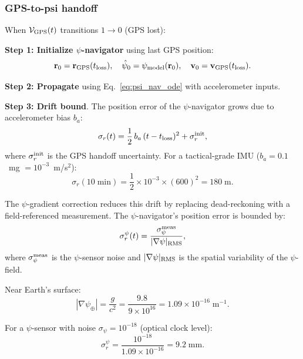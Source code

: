 \documentclass[aps,prd,twocolumn,superscriptaddress,nofootinbib]{revtex4-2}
\begin{document}
\subsubsection{GPS-to-psi handoff}

When $\mathcal{V}_{\rm GPS}(t)$ transitions $1 \to 0$ (GPS lost):

\textbf{Step 1: Initialize $\psi$-navigator} using last GPS position:
\begin{equation}
\mathbf{r}_0 = \mathbf{r}_{\rm GPS}(t_{\rm loss}),\quad
\hat{\psi}_0 = \psi_{\rm model}(\mathbf{r}_0),\quad
\mathbf{v}_0 = \mathbf{v}_{\rm GPS}(t_{\rm loss}).
\label{eq:handoff_init}
\end{equation}

\textbf{Step 2: Propagate} using Eq.~\eqref{eq:psi_nav_ode} with
accelerometer inputs.

\textbf{Step 3: Drift bound}. The position error of the $\psi$-navigator
grows due to accelerometer bias $b_a$:
\begin{equation}
\sigma_r(t) = \frac{1}{2}\,b_a\,(t - t_{\rm loss})^2
+ \sigma_r^{\rm init},
\label{eq:drift_bound}
\end{equation}
where $\sigma_r^{\rm init}$ is the GPS handoff uncertainty.
For a tactical-grade IMU ($b_a = 0.1$~mg $= 10^{-3}$~m/s$^2$):
\begin{equation}
\sigma_r(10\;\text{min}) = \frac{1}{2}\times10^{-3}\times(600)^2
= 180\;\text{m}.
\label{eq:drift_10min}
\end{equation}

The $\psi$-gradient correction reduces this drift by replacing
dead-reckoning with a field-referenced measurement. The $\psi$-navigator's
position error is bounded by:
\begin{equation}
\sigma_r^{\psi}(t) = \frac{\sigma_\psi^{\rm meas}}{|\nabla\psi|_{\rm RMS}},
\label{eq:psi_drift}
\end{equation}
where $\sigma_\psi^{\rm meas}$ is the $\psi$-sensor noise and
$|\nabla\psi|_{\rm RMS}$ is the spatial variability of the $\psi$-field.

Near Earth's surface:
\begin{equation}
|\nabla\psi_\oplus| = \frac{g}{c^2} = \frac{9.8}{9\times10^{16}}
= 1.09\times10^{-16}\;\text{m}^{-1}.
\end{equation}

For a $\psi$-sensor with noise $\sigma_\psi = 10^{-18}$ (optical clock level):
\begin{equation}
\sigma_r^{\psi} = \frac{10^{-18}}{1.09\times10^{-16}} = 9.2\;\text{mm}.
\end{equation}
\end{document}
